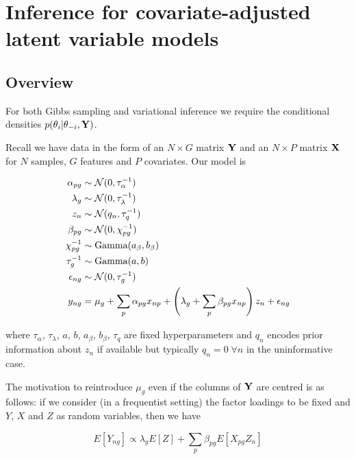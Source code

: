 
\chapter{Inference for covariate-adjusted latent variable models} \label{app:clvm}

\section{Overview}

For both Gibbs sampling and variational inference we require the conditional densities $p(\theta_i | \theta_{-i}, {\bf Y})$.

Recall we have data in the form of an $N \times G$ matrix ${\bf Y}$ and an $N \times P$ matrix ${\bf X}$ for $N$ samples, $G$ features and $P$ covariates. Our model is

\begin{equation}
\begin{aligned}
\alpha_{pg} & \sim \mathcal{N}(0, \tau_\alpha^{-1}) \\
\lambda_g & \sim \mathcal{N}(0, \tau_\lambda^{-1}) \\
z_n & \sim \mathcal{N}(q_n, \tau_q^{-1}) \\
\beta_{pg} & \sim \mathcal{N}(0, \chi_{pg}^{-1}) \\
\chi_{pg}^{-1} & \sim \text{Gamma}(a_\beta, b_\beta) \\
\tau_{g}^{-1} & \sim \text{Gamma}(a, b) \\
\epsilon_{ng} & \sim \mathcal{N}(0, \tau_g^{-1}) \\
y_{ng} & =  \mu_g + \sum_p \alpha_{pg} x_{np} + \left( \lambda_g + \sum_p \beta_{pg} x_{np} \right) z_n + \epsilon_{ng}
\end{aligned} \label{eq:clvm_model}
\end{equation}

where $\tau_\alpha$, $\tau_\lambda$, $a$, $b$, $a_\beta$, $b_\beta$, $\tau_q$ are fixed hyperparameters and $q_n$ encodes prior information about $z_n$ if available but typically $q_n = 0 \; \forall n$ in the uninformative case.



The motivation to reintroduce $\mu_g$ even if the columns of ${\bf Y}$ are centred is as follows: if we consider (in a frequentist setting) the factor loadings to be fixed and $Y$, $X$ and $Z$ as random variables, then we have

\begin{equation}
E[Y_{ng}] \propto \lambda_g E[Z] + \sum_p \beta_{pg} E[X_{pg}Z_n]
\end{equation}

